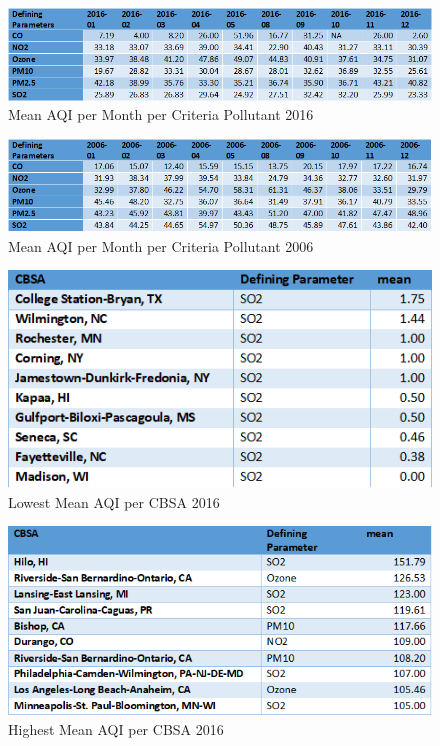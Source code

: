 \documentclass[sigconf]{acmart}
\begin{document}
\begin{figure}[htb]
\includegraphics[width=1.0\columnwidth]{images/avaqibymonth2016.png}
  \caption{ Mean AQI per Month per Criteria Pollutant 2016}
  \label{Mean AQI per Month 2016}
\end{figure}


\begin{figure}[htb]
\includegraphics[width=1.0\columnwidth]{images/avaqibymonth2006.png}
  \caption{ Mean AQI per Month per Criteria Pollutant 2006}
  \label{Mean AQI per Month 2006}
\end{figure}


\begin{figure}[htb]
\includegraphics[width=1.0\columnwidth]{images/lowestmeanaqipercbsa.png}
  \caption{Lowest Mean AQI per CBSA 2016}
  \label{Lowest Mean AQI per CBSA 2016}
\end{figure}

\begin{figure}[htb]
\includegraphics[width=1.0\columnwidth]{images/cbsahighestaqi.png}
  \caption{Highest Mean AQI per CBSA 2016}
  \label{Highest Mean AQI per CBSA 2016}
\end{figure}
\end{document}
